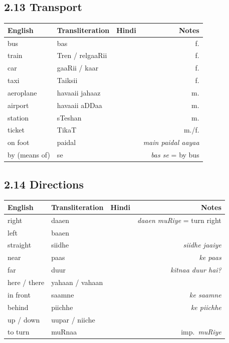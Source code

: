 \subsection{2.13 Transport}

\begin{tabular}{@{}VTDN@{}}
  \toprule
  English & Transliteration & Hindi & Notes \\
  \midrule
  bus & bas &  & f. \\
  train & Tren / relgaaRii &  & f. \\
  car & gaaRii / kaar &  & f. \\
  taxi & Taiksii &  & f. \\
  aeroplane & havaaii jahaaz &  & m. \\
  airport & havaaii aDDaa &  & m. \\
  station & sTeshan &  & m. \\
  ticket & TikaT &  & m./f. \\
  on foot & paidal &  & \textit{main paidal aayaa} \\
  by (means of) & se &  & \textit{bas se} = by bus \\
  \bottomrule
\end{tabular}

\subsection{2.14 Directions}

\begin{tabular}{@{}VTDN@{}}
  \toprule
  English & Transliteration & Hindi & Notes \\
  \midrule
  right & daaen &  & \textit{daaen muRiye} = turn right \\
  left & baaen &  &  \\
  straight & siidhe &  & \textit{siidhe jaaiye} \\
  near & paas &  & \textit{ke paas} \\
  far & duur &  & \textit{kitnaa duur hai?} \\
  here / there & yahaan / vahaan &  &  \\
  in front & saamne &  & \textit{ke saamne} \\
  behind & piichhe &  & \textit{ke piichhe} \\
  up / down & uupar / niiche &  &  \\
  to turn & muRnaa &  & imp.\ \textit{muRiye} \\
  \bottomrule
\end{tabular}

